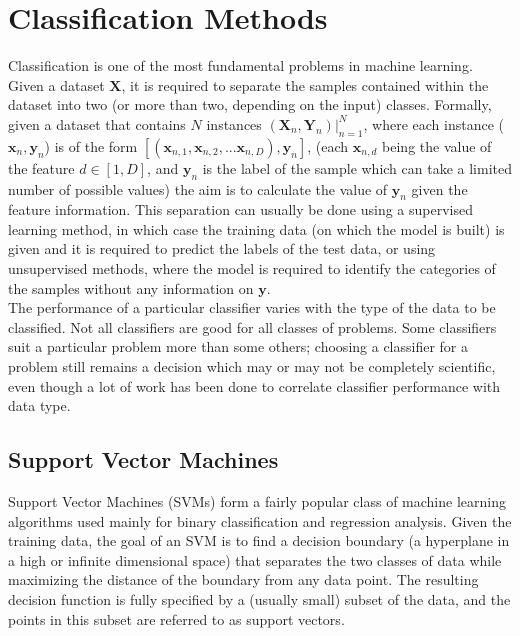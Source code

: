 \chapter{Classification Methods}
\label{chapter:Classification Methods}

Classification is one of the most fundamental problems in machine learning. Given a dataset $\mathbf{X}$, it is required to separate the samples contained within the dataset into two (or more than two, depending on the input) classes. Formally, given a dataset that contains $N$ instances $(\mathbf{X}_{n}, \mathbf{Y}_n) |_{n = 1}^{N}$, where each instance ($\mathbf{x}_{n}, \mathbf{y}_{n}$) is of the form $[(\mathbf{x}_{n, 1}, \mathbf{x}_{n, 2}, ... \mathbf{x}_{n, D}), \mathbf{y}_{n}]$, (each $\mathbf{x}_{n, d}$ being the value of the feature $d \in [1, D]$, and $\mathbf{y}_{n}$ is the label of the sample which can take a limited number of possible values) the aim is to calculate the value of $\mathbf{y}_{n}$ given the feature information. This separation can usually be done using a supervised learning method, in which case the training data (on which the model is built) is given and it is required to predict the labels of the test data, or using unsupervised methods, where the model is required to identify the categories of the samples without any information on $\mathbf{y}$.\\

The performance of a particular classifier varies with the type of the data to be classified. Not all classifiers are good for all classes of problems. Some classifiers suit a particular problem more than some others; choosing a classifier for a problem still remains a decision which may or may not be completely scientific, even though a lot of work has been done to correlate classifier performance with data type.

\section{Support Vector Machines}
Support Vector Machines (SVMs) form a fairly popular class of machine learning algorithms used mainly for binary classification and regression analysis. Given the training data, the goal of an SVM is to find a decision boundary (a hyperplane in a high or infinite dimensional space) that separates the two classes of data while maximizing the distance of the boundary from any data point. The resulting decision function is fully specified by a (usually small) subset of the data, and the points in this subset are referred to as support vectors.\\

